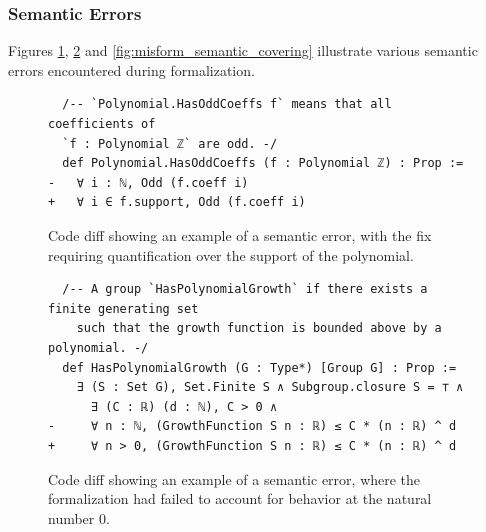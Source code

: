 \subsubsection{Semantic Errors}

Figures 
\ref{fig:misform_semantic_coeffs}, \ref{fig:misform_semantic_growth} and \ref{fig:misform_semantic_covering} illustrate various semantic errors encountered during formalization.

\begin{figure}[h]
    \centering
    \begin{verbatim}
  /-- `Polynomial.HasOddCoeffs f` means that all coefficients of 
  `f : Polynomial ℤ` are odd. -/
  def Polynomial.HasOddCoeffs (f : Polynomial ℤ) : Prop :=
-   ∀ i : ℕ, Odd (f.coeff i)
+   ∀ i ∈ f.support, Odd (f.coeff i)
    \end{verbatim}
    \caption{Code diff showing an example of a semantic error, with the fix requiring quantification over the support of the polynomial.}
    \label{fig:misform_semantic_coeffs}
\end{figure}

\begin{figure}[h]
    \centering
    \begin{verbatim}
  /-- A group `HasPolynomialGrowth` if there exists a finite generating set 
    such that the growth function is bounded above by a polynomial. -/
  def HasPolynomialGrowth (G : Type*) [Group G] : Prop :=
    ∃ (S : Set G), Set.Finite S ∧ Subgroup.closure S = ⊤ ∧
      ∃ (C : ℝ) (d : ℕ), C > 0 ∧
-     ∀ n : ℕ, (GrowthFunction S n : ℝ) ≤ C * (n : ℝ) ^ d
+     ∀ n > 0, (GrowthFunction S n : ℝ) ≤ C * (n : ℝ) ^ d
    \end{verbatim}
    \caption{Code diff showing an example of a semantic error, where the formalization had failed to account for behavior at the natural number $0$.}
    \label{fig:misform_semantic_growth}
\end{figure}

